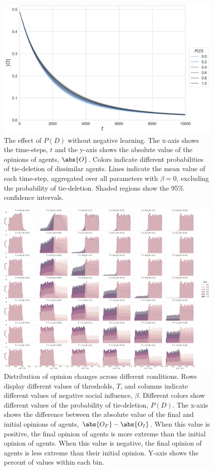 \documentclass[11pt]{article}
\DeclarePairedDelimiter{\abs}\lvert\rvert
\begin{document}
\begin{figure}[H]
    \centering
    \includegraphics[width=.7\linewidth]{../plots/overall/Absolute_Opinion_Tie_Deletion_Without_Negative.png}
  \caption{The effect of $P(D)$ without negative learning. The x-axis shows the time-steps, $t$ and the y-axis shows the absolute value of the opinions of agents, $\abs{O}$. Colors indicate different probabilities of tie-deletion of dissimilar agents. Lines indicate the mean value of each time-step, aggregated over all parameters with $\beta = 0$, excluding the probability of tie-deletion. Shaded regions show the 95\% confidence intervals.}
  \label{fig:pd_no_negative}
\end{figure}

\begin{figure}[H]
    \centering
    \includegraphics[width=.98\linewidth]{../plots/overall/Radicalization.png}
  \caption{Distribution of opinion changes across different conditions. Rows display different values of thresholds, $T$, and columns indicate different values of negative social influence, $\beta$. Different colors show different values of the probability of tie-deletion, $P(D)$. The x-axis shows the difference between the absolute value of the final and initial opinions of agents, $\abs{O_F} - \abs{O_I}$. When this value is positive, the final opinion of agents is more extreme than the initial opinion of agents. When this value is negative, the final opinion of agents is less extreme than their initial opinion. Y-axis shows the percent of values within each bin. }
  \label{fig:radicalization}
\end{figure}
\end{document}
